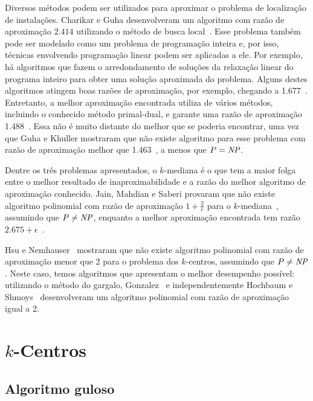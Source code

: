 \documentclass[12pt]{article}
\begin{document}
Diversos métodos podem ser utilizados para aproximar o problema de localização de instalações. Charikar e Guha desenvolveram um algoritmo com razão de aproximação $2.414$ utilizando o método de busca local~\cite{Charikar&Guha'05}.  Esse problema também pode ser modelado como um problema de programação inteira e, por isso, técnicas envolvendo programação linear podem ser aplicadas a ele.  Por exemplo, há algoritmos que fazem o arredondamento de soluções da relaxação linear do programa inteiro para obter uma solução aproximada do problema.  Alguns destes algoritmos atingem boas razões de aproximação, por exemplo, chegando a 1.677~\cite{Byrka&Aardal'10}. Entretanto, a melhor aproximação encontrada utiliza de vários métodos, incluindo o conhecido método primal-dual, e garante uma razão de aproximação 1.488~\cite{LI'13}. Essa não é muito distante do melhor que se poderia encontrar, uma vez que Guha e Khuller mostraram que não existe algoritmo para esse problema com razão de aproximação melhor que 1.463~\cite{GUHA1999228}, a menos que $P = \mathit{NP}$.


Dentre os três problemas apresentados, o $k$-mediana é o que tem a maior folga entre o melhor resultado de inaproximabilidade e a razão do melhor algoritmo de aproximação conhecido. Jain, Mahdian e Saberi provaram que não existe algoritmo polinomial com razão de aproximação $1+ \frac{2}{e}$ para o $k$-mediana~\cite{JMS'02}, assumindo que $P \neq \mathit{NP}$, enquanto a melhor aproximação encontrada tem razão $2.675 + \epsilon$~\cite{BPRST'17}.


Hsu e Nemhauser~\cite{HSU1979209} mostraram que não existe algoritmo polinomial com razão de aproximação menor que 2 para o problema dos $k$-centros, assumindo que $P\neq\mathit{NP}$. Neste caso, temos algoritmos que apresentam o melhor desempenho possível: utilizando o método do gargalo, Gonzalez~\cite{GONZALEZ1985293} e independentemente Hochbaum e Shmoys~\cite{HochShmoys'85} desenvolveram um algoritmo polinomial com razão de aproximação igual a 2.

\section{$k$-Centros}
    

\subsection{Algoritmo guloso}
    
\end{document}
